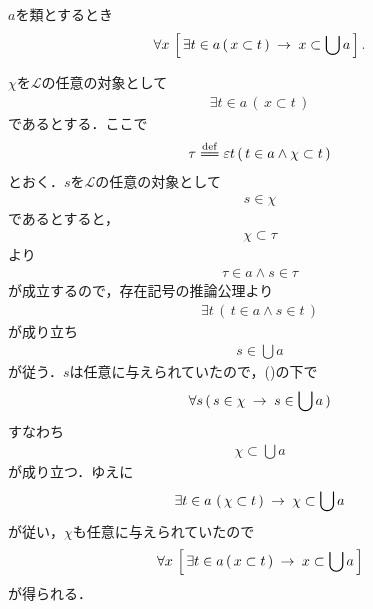 	\begin{screen}
		\begin{thm}[要素の部分集合は合併の部分集合]
		\label{thm:union_is_bigger_than_any_member}
			$a$を類とするとき
			\begin{align}
				\forall x\, \left[\, \exists t \in a\, (\, x \subset t\, ) \hspace{0.25em}\rightarrow\hspace{0.25em} x \subset \bigcup a\, \right].
			\end{align}
		\end{thm}
	\end{screen}
	
	\begin{sketch}
		$\chi$を$\mathcal{L}$の任意の対象として
		\begin{align}
			\exists t \in a\, (\, x \subset t\, )
			\label{fom:thm_union_is_bigger_than_any_member_1}
		\end{align}
		であるとする．ここで
		\begin{align}
			\tau \defeq \varepsilon t\, (\, t \in a \wedge \chi \subset t\, )
		\end{align}
		とおく．$s$を$\mathcal{L}$の任意の対象として
		\begin{align}
			s \in \chi
		\end{align}
		であるとすると，
		\begin{align}
			\chi \subset \tau
		\end{align}
		より
		\begin{align}
			\tau \in a \wedge s \in \tau
		\end{align}
		が成立するので，存在記号の推論公理より
		\begin{align}
			\exists t\, \left(\, t \in a \wedge s \in t\, \right)
		\end{align}
		が成り立ち
		\begin{align}
			s \in \bigcup a
		\end{align}
		が従う．$s$は任意に与えられていたので，()の下で
		\begin{align}
			\forall s\, (\, s \in \chi \hspace{0.25em}\rightarrow\hspace{0.25em} s \in \bigcup a\, )
		\end{align}
		すなわち
		\begin{align}
			\chi \subset \bigcup a
		\end{align}
		が成り立つ．ゆえに
		\begin{align}
			\exists t \in a\, \left(\, \chi \subset t\, \right) \hspace{0.25em}\rightarrow\hspace{0.25em} \chi \subset \bigcup a
		\end{align}
		が従い，$\chi$も任意に与えられていたので
		\begin{align}
			\forall x\, \left[\, \exists t \in a\, (\, x \subset t\, ) \hspace{0.25em}\rightarrow\hspace{0.25em} x \subset \bigcup a\, \right]
		\end{align}
		が得られる．
		\QED
	\end{sketch}
	
